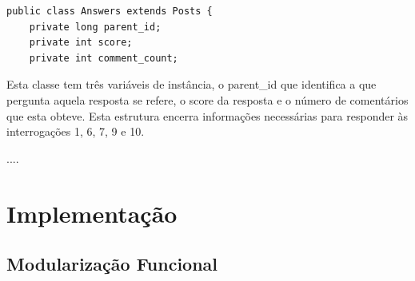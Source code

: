 \documentclass[a4paper]{article}
\begin{document}
\begin{verbatim}
public class Answers extends Posts {
    private long parent_id;
    private int score;
    private int comment_count;
\end{verbatim}

Esta classe tem três variáveis de instância, o parent\_id que identifica a que
pergunta aquela resposta se refere, o score da resposta e o número de comentários
que esta obteve.
Esta estrutura encerra informações necessárias para responder às interrogações 1,
6, 7, 9 e 10.


....


\section{Implementação}
\label{sec:implementacao}

\subsection{Modularização Funcional}
\label{sec:organizacao}
\end{document}
